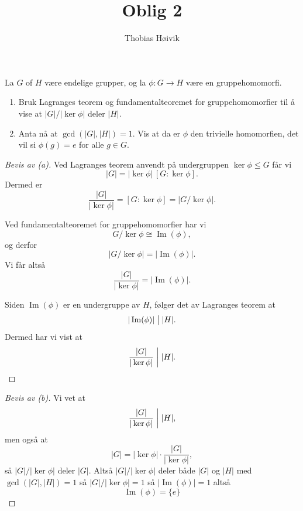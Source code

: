 \documentclass[11pt]{article}
\title{\huge{Oblig 2}}
\author{\LARGE{Thobias Høivik}}
\date{}
\begin{document}
\maketitle

\newpage
\begin{prob*}[1]
    La $G$ of $H$ være endelige grupper, og la $\phi : G \to H$
    være en gruppehomomorfi.

    \begin{enumerate}[label=(\alph*), align=left]
        \item Bruk Lagranges teorem og fundamentalteoremet for 
            gruppehomomorfier til å vise at $|G|/|\ker \phi|$ deler 
            $|H|$.
        \item Anta nå at $\gcd(|G|,|H|) = 1$. Vis at da er 
            $\phi$ den trivielle homomorfien, det vil si 
            $\phi(g) = e$ for alle $g \in G$.
    \end{enumerate}
\end{prob*}
\begin{proof}[Bevis av (a)]
    Ved Lagranges teorem anvendt på undergruppen $\ker\phi \le G$ får vi
    \[
        |G| = |\ker\phi|\,[G:\ker\phi].
    \]
    Dermed er
    \[
        \frac{|G|}{|\ker\phi|} = [G:\ker\phi] = |G/\ker\phi|.
    \]

    Ved fundamentalteoremet for gruppehomomorfier har vi
    \[
        G/\ker\phi \cong \operatorname{Im}(\phi),
    \]
    og derfor
    \[
        |G/\ker\phi| = |\operatorname{Im}(\phi)|.
    \]
    Vi får altså
    \[
        \frac{|G|}{|\ker\phi|} = |\operatorname{Im}(\phi)|.
    \]

    Siden $\operatorname{Im}(\phi)$ er en undergruppe av $H$, 
    følger det av
    Lagranges teorem at
    \[
        |\operatorname{Im}(\phi)| \bigm| |H|.
    \]
    Dermed har vi vist at
    \[
        \frac{|G|}{|\ker\phi|} \biggm| |H|.
    \]
\end{proof}
\begin{proof}[Bevis av (b)]
    Vi vet at 
    \[
        \frac{|G|}{|\ker \phi|} \biggm| |H|,
    \]
    men også at 
    \[
        |G| = |\ker \phi| \cdot \frac{|G|}{|\ker\phi|},
    \]
    så $|G|/|\ker \phi|$ deler $|G|$. Altså $|G|/|\ker \phi|$ deler 
    både $|G|$ og $|H|$ med $\gcd(|G|,|H|) = 1$ så 
    $|G|/|\ker \phi| = 1$ så $|\operatorname{Im}(\phi)| = 1$ altså 
    \[
        \operatorname{Im}(\phi) = \{e\}
    \]
\end{proof}
\end{document}
